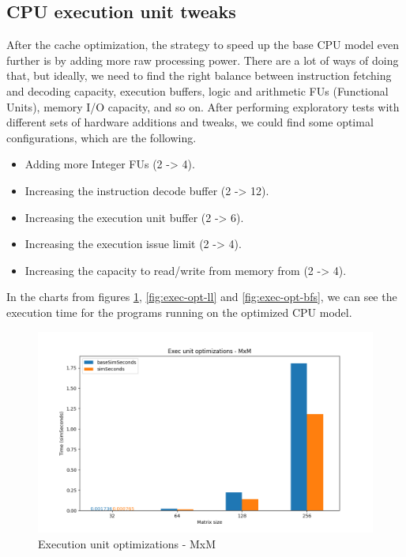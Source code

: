\documentclass[
	article,			%
	11pt,				%
	oneside,			%
	a4paper,			%
	brazil,				%
        english,			%
	sumario=tradicional
	]{abntex2}
\begin{document}
\subsection{CPU execution unit tweaks}
After the cache optimization, the strategy to speed up the base CPU model even further is by adding more raw processing power. There are a lot of ways of doing that, but ideally, we need to find the right balance between instruction fetching and decoding capacity, execution buffers, logic and arithmetic FUs (Functional Units), memory I/O capacity, and so on. After performing exploratory tests with different sets of hardware additions and tweaks, we could find some optimal configurations, which are the following.
\begin{itemize}
    \item Adding more Integer FUs (2 -> 4).
    \item Increasing the instruction decode buffer (2 -> 12).
    \item Increasing the execution unit buffer (2 -> 6).
    \item Increasing the execution issue limit (2 -> 4).
    \item Increasing the capacity to read/write from memory from (2 -> 4).
\end{itemize}
In the charts from figures \ref{fig:exec-opt-mxm}, \ref{fig:exec-opt-ll} and \ref{fig:exec-opt-bfs}, we can see the execution time for the programs running on the optimized CPU model.

\begin{figure}[H]
\caption{Execution unit optimizations - MxM}
\label{fig:exec-opt-mxm}
\includegraphics[width=\textwidth]{images/exec-opt-mxm.png}
\end{figure}
\end{document}
